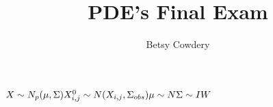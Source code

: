 \documentclass[11pt,fleqn]{article}
\theoremstyle{definition}
\theoremstyle{remark}
\theoremstyle{definition}
\begin{document}
\author{Betsy Cowdery}
\title{PDE's Final Exam}
\date{}

\maketitle

\noindent
$
X \sim N_p(\mu,\Sigma) \\
X^0_{i,j} \sim N(X_{i,j}, \Sigma_{obs}) \\
\mu \sim N \\
\Sigma \sim IW 
$
\end{document}
